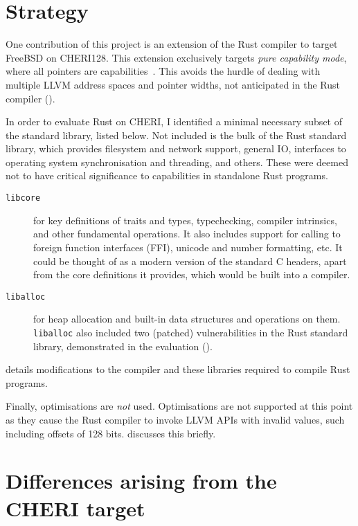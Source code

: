 \documentclass[dissertation.tex]{subfiles}
\begin{document}
\section{Strategy}
\label{sec:impl-what}

One contribution of this project is an extension of the Rust compiler to
target FreeBSD on CHERI128.
This extension exclusively targets \emph{pure capability mode}, where
all pointers are capabilities~\cite{cheri-prog-guide}.
This avoids the hurdle of dealing with multiple LLVM address spaces and
pointer widths, not anticipated in the Rust compiler
().

In order to evaluate  Rust on CHERI, I identified
a minimal necessary subset of the standard library, listed below.
Not included is the bulk of the Rust standard library, which provides
filesystem and network support, general IO, interfaces to operating
system synchronisation and threading, and others.
These were deemed not to have critical significance to capabilities in
standalone Rust programs.

\begin{description}
    \item[\texttt{libcore}] for key definitions of traits and types,
    typechecking, compiler intrinsics, and other fundamental operations.
    It also includes support for calling to foreign function interfaces
    (FFI), unicode and number formatting, etc.
    It could be thought of as a modern version of the standard C
    headers, apart from the core definitions it provides, which would be
    built into a compiler.
    \item[\texttt{liballoc}] for heap allocation and built-in data
    structures and operations on them.
    \texttt{liballoc} also included two (patched) vulnerabilities in the
    Rust standard library, demonstrated in the evaluation
    ().
\end{description}

 details modifications to the compiler and
these libraries required to compile Rust programs.

Finally, optimisations are \emph{not} used.
Optimisations are not supported at this point as they cause the Rust
compiler to invoke LLVM APIs with invalid values, such including
offsets of 128 bits.
 discusses this briefly.


\section{Differences arising from the CHERI target}
\label{sec:impl-divergences}
\end{document}
